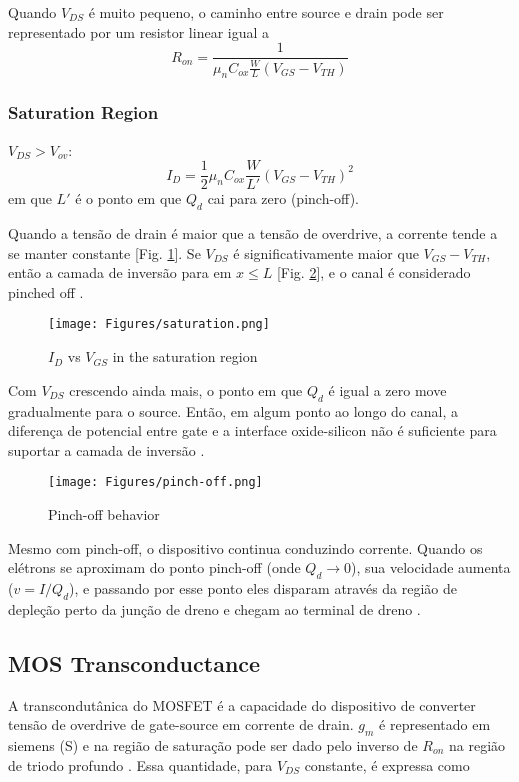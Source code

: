 \documentclass[10pt, conference,a4paper]{IEEEtran}
\begin{document}
    Quando $V_{DS}$ é muito pequeno, o caminho entre source e drain pode ser representado por um resistor linear igual a
    \begin{equation}
        R_{on} = \frac{1}{\mu_n C_{ox} \frac{W}{L} (V_{GS} - V_{TH})}
    \end{equation}
    
    
\subsubsection{Saturation Region}
$V_{DS} > V_{ov}$:
    \begin{equation}
    I_D = \frac{1}{2} \mu_n C_{ox} \frac{W}{L'} (V_{GS} - V_{TH})^2
    \label{eq:saturação}
\end{equation}
em que $L'$ é o ponto em que $Q_d$ cai para zero (pinch-off).

Quando a tensão de drain é maior que a tensão de overdrive, a corrente tende a se manter constante [Fig. \ref{fig:saturation}]. Se $V_{DS}$ é significativamente maior que $V_{GS} - V_{TH}$, então a camada de inversão para em $x \leq L$ [Fig. \ref{fig:pinch-off}], e o canal é considerado pinched off \cite{razavi2005design}.

\begin{figure}[h]
\centering
\texttt{[image: Figures/saturation.png]}
    \caption{$I_D$ vs $V_{GS}$ in the saturation region}
    \label{fig:saturation}
\end{figure}

Com $V_{DS}$ crescendo ainda mais, o ponto em que $Q_d$ é igual a zero move gradualmente para o source. Então, em algum ponto ao longo do canal, a diferença de potencial entre gate e a interface oxide-silicon não é suficiente para suportar a camada de inversão \cite{razavi2005design}.

\begin{figure}[h]
\centering
\texttt{[image: Figures/pinch-off.png]}
    \caption{Pinch-off behavior}
    \label{fig:pinch-off}
\end{figure}

Mesmo com pinch-off, o dispositivo continua conduzindo corrente. Quando os elétrons se aproximam do ponto pinch-off (onde $Q_d \rightarrow 0 $), sua velocidade aumenta ($v = I/Q_d$), e passando por esse ponto eles disparam através da região de depleção perto da junção de dreno e chegam ao terminal de dreno \cite{razavi2005design}.

\subsection{MOS Transconductance}
A transcondutânica do MOSFET é a capacidade do dispositivo de converter tensão de overdrive de gate-source em corrente de drain. $g_m$ é representado em siemens (S) e na região de saturação pode ser dado pelo inverso de $R_{on}$ na região de triodo profundo \cite{razavi2005design}. Essa quantidade, para $V_{DS}$ constante, é expressa como
\end{document}
